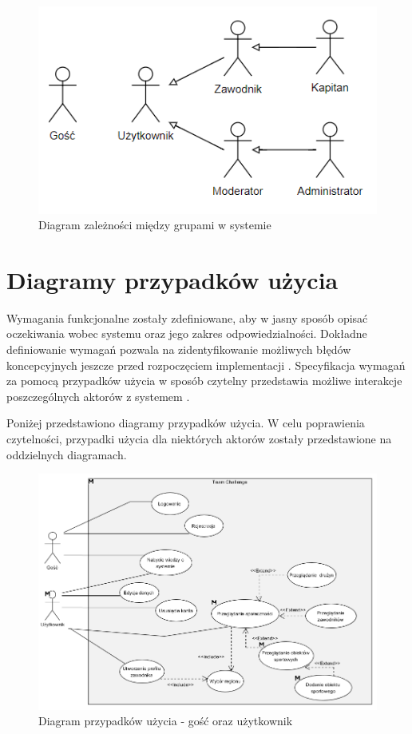 \begin{figure}[H]
\centering
\includegraphics[width=0.5\linewidth]{04-projekt/rys/roles.PNG}
\caption{Diagram zależności między grupami w systemie}
\label{fig:diagram-groups}
\end{figure}


\section{Diagramy przypadków użycia}

Wymagania funkcjonalne zostały zdefiniowane, aby w jasny sposób opisać oczekiwania wobec systemu oraz jego zakres odpowiedzialności. Dokładne definiowanie wymagań pozwala na zidentyfikowanie możliwych błędów koncepcyjnych jeszcze przed rozpoczęciem implementacji \cite{requirements}. Specyfikacja wymagań za pomocą przypadków użycia w sposób czytelny przedstawia możliwe interakcje poszczególnych aktorów z systemem \cite{usecase}.

Poniżej przedstawiono diagramy przypadków użycia. W celu poprawienia czytelności, przypadki użycia dla niektórych aktorów zostały przedstawione na oddzielnych diagramach. 



\begin{figure}[H]
\centering
\includegraphics[width=\linewidth]{04-projekt/rys/usecase1.PNG}
\caption{Diagram przypadków użycia - gość oraz użytkownik}
\label{fig:diagram-uc-1}
\end{figure}

